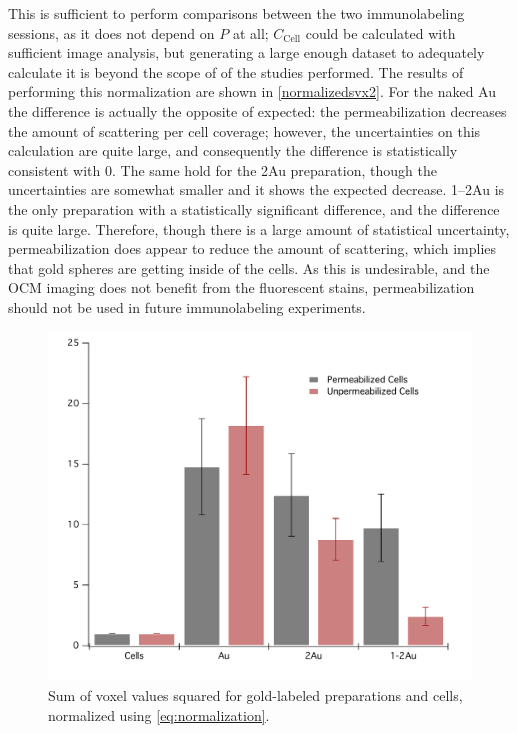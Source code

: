 This is sufficient to perform comparisons between the two immunolabeling sessions, as it does not depend on $P$ at all; $C_{\mathrm{Cell}}$ could be calculated with sufficient image analysis, but generating a large enough dataset to adequately calculate it is beyond the scope of of the studies performed. The results of performing this normalization are shown in \autoref{normalizedsvx2}. For the naked Au the difference is actually the opposite of expected: the permeabilization decreases the amount of scattering per cell coverage; however, the uncertainties on this calculation are quite large, and consequently the difference is statistically consistent with 0. The same hold for the 2Au preparation, though the uncertainties are somewhat smaller and it shows the expected decrease. 1--2Au is the only preparation with a statistically significant difference, and the difference is quite large. Therefore, though there is a large amount of statistical uncertainty, permeabilization does appear to reduce the amount of scattering, which implies that gold spheres are getting inside of the cells. As this is undesirable, and the OCM imaging does not benefit from the fluorescent stains, permeabilization should not be used in future immunolabeling experiments.

\begin{figure}[htbp]
\centering
\includegraphics[keepaspectratio,width=\textwidth,height=0.75\textheight]{NormalizedSvx2.pdf}
\caption{Sum of voxel values squared for gold-labeled preparations and cells, normalized using \autoref{eq:normalization}.}
\label{normalizedsvx2}
\end{figure}



